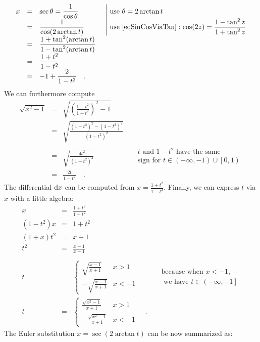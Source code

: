\documentclass[12pt]{book}
\newcommand{\doublebrace}[4]{\left\{\begin{array}{ll} #1 & #2 \\#3 & #4  \end{array} \right.}
\begin{document}
\begin{equation*}
\begin{array}{rcll|l}
x&=&\displaystyle \sec \theta=\frac{1}{\cos \theta} && \text{use } \theta =2 \arctan t\\
&=&\displaystyle \frac{1} {\cos(2\arctan t)} &&\text{use } \eqref{eqSinCosViaTan}: \displaystyle \cos (2z) = \frac{ 1- \tan^2 z}{1+ \tan^2 z}\\
&=& \displaystyle \frac{1+\tan^2(\arctan t)}{1-\tan^2( \arctan t)} \\
&=&\displaystyle \frac{1+t^2}{1-t^2}\\
&=&\displaystyle-1+\frac{2}{1-t^2} \quad .
\end{array}
\end{equation*}
We can furthermore compute
\begin{equation}\label{eqsqrtxsquareminus1E2}
\begin{array}{rcll|l}
\sqrt{x^2-1 }&=&\displaystyle \sqrt{ \left(\frac{1+t^2}{1-t^2}\right)^2-1}\\
&=& \displaystyle \sqrt{\frac{(1+t^2)^2-(1-t^2)^2}{(1-t^2)^2} }\\
&=& \displaystyle \sqrt{\frac{4t^2}{(1-t^2)^2}} && \begin{array}{l} \displaystyle t \text{ and }1-t^2\text{ have the same}\\ \text{sign for } t\in (-\infty, -1) \cup \left[0, 1 \right)\end{array} \\
&=&\displaystyle \frac{2t}{1-t^2}\quad .
\end{array}
\end{equation}
The differential ${\normalfont \text{d}} x$ can be computed from $x=\frac{1+t^2}{1-t^2}$. Finally, we can express $t$ via $x$ with a little algebra:
\[
\begin{array}{rcll|l}
\displaystyle x&=&\displaystyle  \frac{1+t^2}{ 1- t^2} \\
\displaystyle (1- t^2)x&=&\displaystyle  1+t^2\\
\displaystyle (1+ x)t^2&=&\displaystyle  x-1\\
\displaystyle t^2&=&\displaystyle  \frac{x-1}{x+1}\\
\\
\displaystyle t&=&\displaystyle \doublebrace{ \sqrt{\frac{x-1}{x+1}}}{x>1}{-\sqrt{\frac{x-1}{x+1}}}{x<-1} &&\begin{array}{l} \text{because when } x<-1, \\ \text{ we have } t\in \left( -\infty , -1 \right]\end{array} \\
\displaystyle t&=&\displaystyle \doublebrace{ \frac{\sqrt{ x^2 -1}}{x+1}}{x>1}{-\frac{\sqrt{x^2-1}}{x+1}}{x<-1}  \quad .
\end{array}
\]
The Euler substitution $x= \sec (2\arctan t)$ can be now summarized as:
\end{document}
